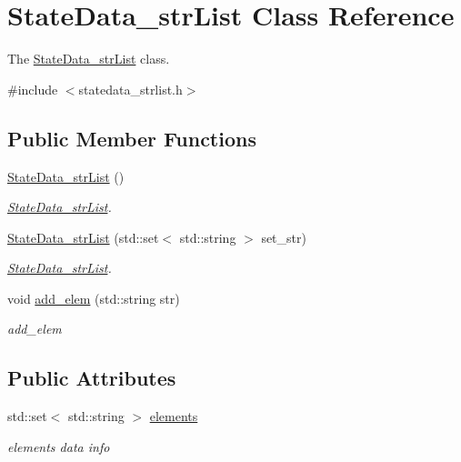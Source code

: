 \hypertarget{class_state_data__str_list}{}\section{State\+Data\+\_\+str\+List Class Reference}
\label{class_state_data__str_list}


The \hyperlink{class_state_data__str_list}{State\+Data\+\_\+str\+List} class.  




{\ttfamily \#include $<$statedata\+\_\+strlist.\+h$>$}

\subsection*{Public Member Functions}
\begin{DoxyCompactItemize}
\item 
\hyperlink{class_state_data__str_list_a65c09c99fa2d90f1aaeae3e01552fcff}{State\+Data\+\_\+str\+List} ()\hypertarget{class_state_data__str_list_a65c09c99fa2d90f1aaeae3e01552fcff}{}\label{class_state_data__str_list_a65c09c99fa2d90f1aaeae3e01552fcff}

\begin{DoxyCompactList}\small\item\em \hyperlink{class_state_data__str_list}{State\+Data\+\_\+str\+List}. \end{DoxyCompactList}\item 
\hyperlink{class_state_data__str_list_a09aa0643b3d92b3cc16463c713b94c0c}{State\+Data\+\_\+str\+List} (std\+::set$<$ std\+::string $>$ set\+\_\+str)
\begin{DoxyCompactList}\small\item\em \hyperlink{class_state_data__str_list}{State\+Data\+\_\+str\+List}. \end{DoxyCompactList}\item 
void \hyperlink{class_state_data__str_list_a8c9e41f183ad25e416a5c776c6e5efb9}{add\+\_\+elem} (std\+::string str)
\begin{DoxyCompactList}\small\item\em add\+\_\+elem \end{DoxyCompactList}\end{DoxyCompactItemize}
\subsection*{Public Attributes}
\begin{DoxyCompactItemize}
\item 
std\+::set$<$ std\+::string $>$ \hyperlink{class_state_data__str_list_a94ee843dcb510ee769f531124e37ef13}{elements}\hypertarget{class_state_data__str_list_a94ee843dcb510ee769f531124e37ef13}{}\label{class_state_data__str_list_a94ee843dcb510ee769f531124e37ef13}

\begin{DoxyCompactList}\small\item\em elements data info \end{DoxyCompactList}\end{DoxyCompactItemize}
